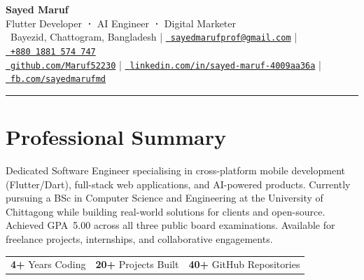\documentclass[10pt, a4paper]{article}
\newcommand{\iconlink}[3]{\href{#2}{#1~\texttt{\footnotesize#3}}}
\begin{document}
\pagestyle{empty}

\begin{center}
  {\Huge\bfseries\color{dark} Sayed Maruf}\\[4pt]
  {\large\color{accent} Flutter Developer \textbf{·} AI Engineer \textbf{·} Digital Marketer}\\[8pt]
  \color{mid}
  \faMapMarker*~Bayezid, Chattogram, Bangladesh
  \quad|\quad
  \iconlink{\faEnvelope}{mailto:sayedmarufprof@gmail.com}{sayedmarufprof@gmail.com}
  \quad|\quad
  \iconlink{\faPhone}{tel:+8801881574747}{+880~1881~574~747}
  \\[4pt]
  \iconlink{\faGithub}{https://github.com/Maruf52230}{github.com/Maruf52230}
  \quad|\quad
  \iconlink{\faLinkedin}{https://www.linkedin.com/in/sayed-maruf-4009aa36a}{linkedin.com/in/sayed-maruf-4009aa36a}
  \quad|\quad
  \iconlink{\faFacebook}{https://www.facebook.com/sayedmarufmd}{fb.com/sayedmarufmd}
\end{center}

\vspace{2pt}
\noindent\textcolor{light}{\hrule height 0.5pt}
\vspace{8pt}

\section{Professional Summary}

Dedicated Software Engineer specialising in cross-platform mobile development (Flutter/Dart),
full-stack web applications, and AI-powered products. Currently pursuing a BSc in Computer
Science and Engineering at the University of Chittagong while building real-world solutions
for clients and open-source. Achieved GPA~5.00 across all three public board examinations.
Available for freelance projects, internships, and collaborative engagements.

\medskip
\begin{tabularx}{\linewidth}{@{} X X X @{}}
  \textbf{\color{accent}4+} Years Coding &
  \textbf{\color{accent}20+} Projects Built &
  \textbf{\color{accent}40+} GitHub Repositories
\end{tabularx}
\end{document}
